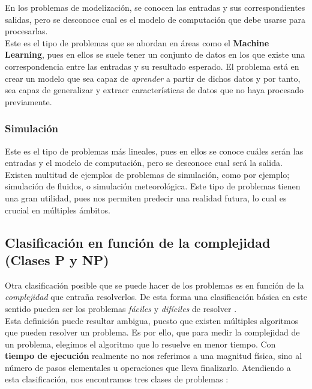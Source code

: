 En los problemas de modelización, se conocen las entradas y sus correspondientes salidas, pero se desconoce cual es el modelo de computación que debe usarse para procesarlas. \\


Este es el tipo de problemas que se abordan en áreas como el \textbf{Machine Learning}, pues en ellos se suele tener un conjunto de datos en los que existe una correspondencia entre las entradas y su resultado esperado. El problema está en crear un modelo que sea capaz de \textit{aprender} a partir de dichos datos y por tanto, sea capaz de generalizar y extraer características de datos que no haya procesado previamente.

\subsubsection{Simulación}

Este es el tipo de problemas más lineales, pues en ellos se conoce cuáles serán las entradas y el modelo de computación, pero se desconoce cual será la salida. \\

Existen multitud de ejemplos de problemas de simulación, como por ejemplo; simulación de fluidos, o simulación meteorológica. Este tipo de problemas tienen una gran utilidad, pues nos permiten predecir una realidad futura, lo cual es crucial en múltiples ámbitos. \\


\subsection{Clasificación en función de la complejidad (Clases P y NP)}

Otra clasificación posible que se puede hacer de los problemas es en función de la \textit{complejidad} que entraña resolverlos. De esta forma una clasificación básica en este sentido pueden ser los problemas \textit{fáciles} y \textit{difíciles} de resolver \cite{garey2002computers}.\\

Esta definición puede resultar ambigua, puesto que existen múltiples algoritmos que pueden resolver un problema. Es por ello, que para medir la complejidad de un problema, elegimos el algoritmo que lo resuelve en menor tiempo. Con \textbf{tiempo de ejecución} realmente no nos referimos a una magnitud física, sino al número de pasos elementales u operaciones que lleva finalizarlo. Atendiendo a esta clasificación, nos encontramos tres clases de problemas \cite{papadimitriou2003computational}:

